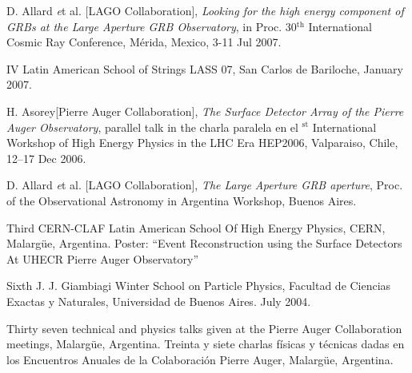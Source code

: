 \begin{etaremune}
\item {}D. Allard {\emph et al.} [LAGO Collaboration], {\emph{Looking for the high energy component of GRBs at the Large Aperture GRB Observatory}}, in Proc. 30$^{\mathrm{th}}$ International Cosmic Ray Conference,  Mérida, Mexico, 3-11 Jul 2007.

\item {}IV Latin American School of Strings LASS 07, San Carlos de Bariloche, January 2007.

\item {}H. Asorey[Pierre Auger Collaboration], {\emph{The Surface Detector Array of the Pierre Auger Observatory}}, 
\ifeng
parallel talk in the 
\else
charla paralela en el 
$^{\mathrm{st}}$ International Workshop of High Energy Physics in the LHC Era HEP2006, Valparaiso, Chile, 12--17 Dec 2006.

\item {}D. Allard {\emph et al.} [LAGO Collaboration], {\emph{The Large Aperture GRB aperture}}, \en Proc. of the Observational Astronomy in Argentina Workshop, Buenos Aires.

\item {}Third CERN-CLAF Latin American School Of High Energy Physics, CERN, Malargüe, Argentina. Poster: ``Event Reconstruction using the Surface Detectors At UHECR Pierre Auger Observatory''

\item {}Sixth J. J. Giambiagi Winter School on Particle Physics, Facultad de Ciencias Exactas y Naturales, Universidad de Buenos Aires. July 2004.

\item {} 
\ifeng
Thirty seven technical and physics talks given at the Pierre Auger Collaboration meetings, Malargüe, Argentina.
\else
Treinta y siete charlas físicas y técnicas dadas en los Encuentros Anuales de la Colaboración Pierre Auger, Malargüe, Argentina.
\fi
\end{etaremune}
